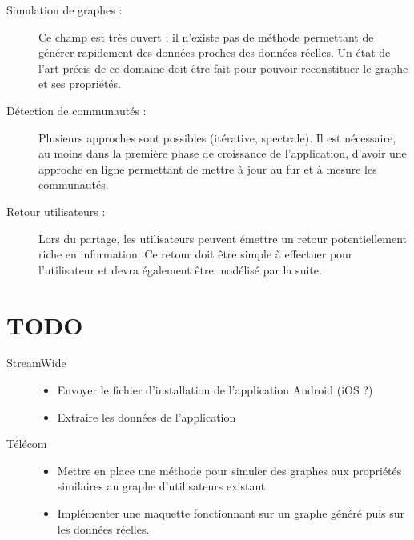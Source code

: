 \documentclass[a4paper]{article}
\begin{document}
\begin{description}
    \item[Simulation de graphes :] Ce champ est très ouvert ; il n'existe
        pas de m\'ethode permettant de g\'en\'erer rapidement des donn\'ees
        proches des donn\'ees r\'eelles. Un \'etat de l'art pr\'ecis de ce
        domaine doit être fait pour pouvoir reconstituer le graphe et ses
        propri\'et\'es.
    \item[D\'etection de communaut\'es :] Plusieurs approches sont possibles
        (it\'erative, spectrale). Il est n\'ecessaire, au moins dans la première
        phase de croissance de l'application, d'avoir une approche
        en ligne permettant de mettre à jour au fur et à mesure les
        communaut\'es.
    \item[Retour utilisateurs :] Lors du partage, les utilisateurs
        peuvent \'emettre un retour potentiellement riche en information.
        Ce retour doit être simple à effectuer pour l'utilisateur et
        devra \'egalement être mod\'elis\'e par la suite.
\end{description}

\section*{TODO}
\label{sec:TODO}

\begin{description}
    \item[StreamWide]\hfill
        \begin{itemize}
            \item Envoyer le fichier d'installation de l'application Android (iOS ?)
            \item Extraire les donn\'ees de l'application
        \end{itemize}
    \item[T\'el\'ecom]\hfill
        \begin{itemize}
            \item Mettre en place une m\'ethode pour simuler des graphes aux
                propri\'et\'es similaires au graphe d'utilisateurs existant.
            \item Impl\'ementer une maquette fonctionnant sur un graphe
                g\'en\'er\'e puis sur les donn\'ees r\'eelles.
        \end{itemize}
\end{description}
\end{document}
